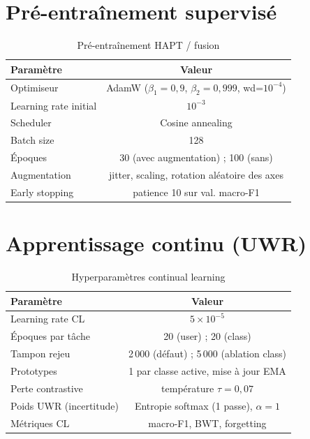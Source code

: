 \documentclass[a4paper,12pt]{report}
\begin{document}
\section{Pré-entraînement supervisé}

\begin{table}[H]
\centering
\small
\begin{tabularx}{\textwidth}{|Y|c|}
\hline
\textbf{Paramètre} & \textbf{Valeur} \\
\hline
Optimiseur & AdamW ($\beta_1=0{,}9$, $\beta_2=0{,}999$, wd=$10^{-4}$) \\
Learning rate initial & $10^{-3}$ \\
Scheduler & Cosine annealing \\
Batch size & 128 \\
Époques & 30 (avec augmentation) ; 100 (sans) \\
Augmentation & jitter, scaling, rotation aléatoire des axes \\
Early stopping & patience 10 sur val. macro-F1 \\
\hline
\end{tabularx}
\caption{Pré-entraînement HAPT / fusion}
\label{tab:app_pretrain}
\end{table}

\section{Apprentissage continu (UWR)}

\begin{table}[H]
\centering
\small
\begin{tabularx}{\textwidth}{|Y|c|}
\hline
\textbf{Paramètre} & \textbf{Valeur} \\
\hline
Learning rate CL & $5 \times 10^{-5}$ \\
Époques par tâche & 20 (user) ; 20 (class) \\
Tampon rejeu & 2\,000 (défaut) ; 5\,000 (ablation class) \\
Prototypes & 1 par classe active, mise à jour EMA \\
Perte contrastive & température $\tau = 0{,}07$ \\
Poids UWR (incertitude) & Entropie softmax (1 passe), $\alpha=1$ \\
Métriques CL & macro-F1, BWT, forgetting \parencite{delange2021} \\
\hline
\end{tabularx}
\caption{Hyperparamètres continual learning}
\label{tab:app_cl}
\end{table}
\end{document}
